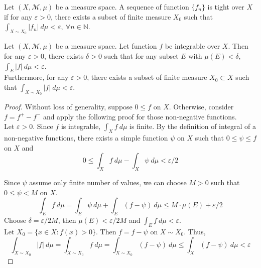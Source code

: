 \begin{definition}
	Let $(X,\mathcal{M},\mu)$ be a measure space.
	A sequence of function $\{ f_n \}$ is tight over $X$ if for any $\varepsilon > 0$, there exists a subset of finite measure $X_0$ such that $\displaystyle \int_{X \sim X_0} | f_n | \ d\mu < \varepsilon,\ \forall n \in \mathbb{N}$.
\end{definition}

\begin{theorem}
	Let $(X,\mathcal{M},\mu)$ be a measure space.
	Let function $f$ be integrable over $X$.
	Then for any $\varepsilon > 0$, there exists $\delta > 0$ such that for any subset $E$ with $\mu(E) < \delta$, $\displaystyle \int_E |f| \ d\mu < \varepsilon$.\\

	Furthermore, for any $\varepsilon > 0$, there exists a subset of finite measure $X_0 \subset X$ such that $\displaystyle \int_{X \sim X_0} |f| \ d\mu < \varepsilon$.
\end{theorem}
\begin{proof}
	Without loss of generality, suppose $0 \le f$ on $X$.
	Otherwise, consider $f = f^+ - f^-$ and apply the following proof for those non-negative functions.\\

	Let $\varepsilon > 0$.
	Since $f$ is integrable, $\int_X f \ d\mu $ is finite.
	By the definition of integral of a non-negative functions, there exists a simple function $\psi$ on $X$ such that $0 \le \psi \le f$ on $X$ and
	\[ 0 \le \int_X f \ d\mu - \int_X \psi \ d\mu < \varepsilon/2 \]

	Since $\psi$ assume only finite number of values, we can choose $M > 0$ such that $0 \le \psi < M$ on $X$.
	\[ \int_E f \ d\mu = \int_E \psi \ d\mu + \int_E (f - \psi) \ d\mu \le M \cdot \mu(E) + \varepsilon/2 \]
	Choose $\delta = \varepsilon/2M$, then $\mu(E) < \varepsilon/2M$ and $\int_E f \ d\mu < \varepsilon$.\\

	Let $X_0 = \{ x \in X : f(x) > 0 \}$.
	Then $f = f-\psi$ on $X \sim X_0$.
	Thus,
	\[ \int_{X \sim X_0} |f| \ d\mu = \int_{X \sim X_0} f \ d\mu = \int_{X \sim X_0} (f-\psi) \ d\mu \le \int_X (f-\psi) \ d\mu < \varepsilon \]
\end{proof}

